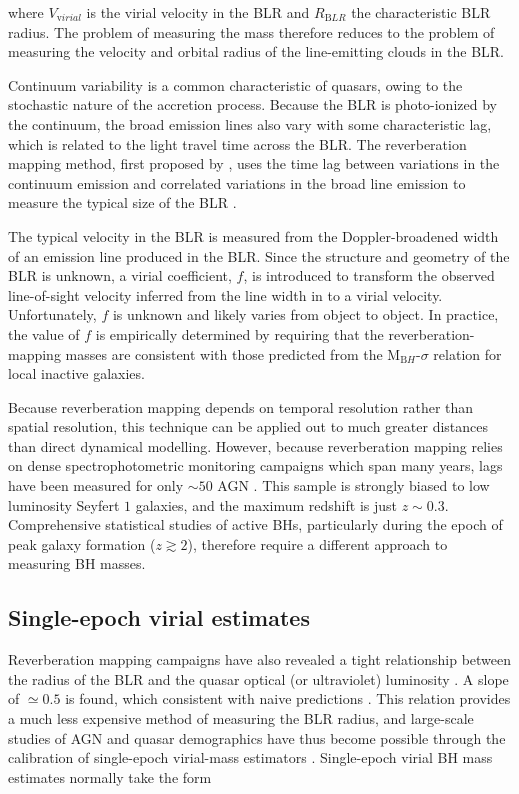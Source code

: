 where $V_{\mathrm virial}$ is the virial velocity in the BLR and $R_{\mathrm BLR}$ the characteristic BLR radius.
The problem of measuring the mass therefore reduces to the problem of measuring the velocity and orbital radius of the line-emitting clouds in the BLR. 

Continuum variability is a common characteristic of quasars, owing to the stochastic nature of the accretion process.  
Because the BLR is photo-ionized by the continuum, the broad emission lines also vary with some characteristic lag, which is related to the light travel time across the BLR. 
The reverberation mapping method, first proposed by \citet{blandford82a}, uses the time lag between variations in the continuum emission and correlated variations in the broad line emission to measure the typical size of the BLR \citep[e.g.][]{peterson93,netzer97,peterson14}. 

The typical velocity in the BLR is measured from the Doppler-broadened width of an emission line produced in the BLR. 
Since the structure and geometry of the BLR is unknown, a virial coefficient, $f$, is introduced to transform the observed line-of-sight velocity inferred from the line width in to a virial velocity.
Unfortunately, $f$ is unknown and likely varies from object to object.  
In practice, the value of $f$ is empirically determined by requiring that the reverberation-mapping masses are consistent with those predicted from the M$_{\mathrm BH}$-$\sigma$ relation for local inactive galaxies. 

Because reverberation mapping depends on temporal resolution rather than spatial resolution, this technique can be applied out to much greater distances than direct dynamical modelling.
However, because reverberation mapping relies on dense spectrophotometric monitoring campaigns which span many years, lags have been measured for only $\sim50$ AGN \citep[e.g.][]{kaspi00,peterson04,kaspi07,bentz09,denney10,barth11,grier12}. 
This sample is strongly biased to low luminosity Seyfert $1$ galaxies, and the maximum redshift is just $z\sim0.3$. 
Comprehensive statistical studies of active BHs, particularly during the epoch of peak galaxy formation ($z\gtrsim2$), therefore require a different approach to measuring BH masses. 

\subsection{Single-epoch virial estimates}

Reverberation mapping campaigns have also revealed a tight relationship between the radius of the BLR and the quasar optical (or ultraviolet) luminosity \citep[the $R-L$ relation; e.g.][]{kaspi00,kaspi07}.
A slope of $\simeq0.5$ is found, which consistent with naive predictions \citep[e.g.][]{peterson97}. 
This relation provides a much less expensive method of measuring the BLR radius, and large-scale studies of AGN and quasar demographics have thus become possible through the calibration of single-epoch virial-mass estimators \citep[e.g.][]{greene05b,vestergaard06,vestergaard09,shen11,shen12,trakhtenbrot12}.
Single-epoch virial BH mass estimates normally take the form

